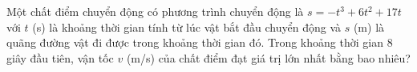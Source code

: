 \begin{ex}%
	Một chất điểm chuyển động có phương trình chuyển động là $s=-t^3+6t^2+17t$ với $t$ (s) là khoảng thời gian tính từ lúc vật bắt đầu chuyển động và $s$ (m) là quãng đường vật đi được trong khoảng thời gian đó. Trong khoảng thời gian $8$ giây đầu tiên, vận tốc $v$ (m/s) của chất điểm đạt giá trị lớn nhất bằng bao nhiêu?
	\par{}
\end{ex}


